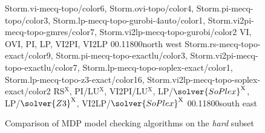 
\begin{figure*}[t]
	\centering
	\vspace{1ex} %
	{Storm.vi-mecq-topo/color6, Storm.ovi-topo/color4, Storm.pi-mecq-topo/color3, Storm.lp-mecq-topo-gurobi-4auto/color1, Storm.vi2pi-mecq-topo-gmres/color7, Storm.vi2lp-mecq-topo-gurobi/color2}
	{VI, OVI, PI, LP, VI2PI, VI2LP}
	{0}{\numqvbshard}{0.1}{1800}{north west}%
	{Storm.rs-mecq-topo-exact/color9, Storm.pi-mecq-topo-exactlu/color3, Storm.vi2pi-mecq-topo-exactlu/color7, Storm.lp-mecq-topo-soplex-exact/color1, Storm.lp-mecq-topo-z3-exact/color16, Storm.vi2lp-mecq-topo-soplex-exact/color2}
	{RS$^\mathrm{X}$, PI/LU$^\mathrm{X}$, VI2PI/LU$^\mathrm{X}$, LP/$\solver{SoPlex}^\mathrm{X}$, LP/$\solver{Z3}^\mathrm{X}$, VI2LP/$\solver{SoPlex}^\mathrm{X}$}
	{0}{\numqvbshard}{0.1}{1800}{south east}
	\caption{Comparison of MDP model checking algorithms on the \textit{hard} subset}
	\label{fig:MethodsHard}
\end{figure*}